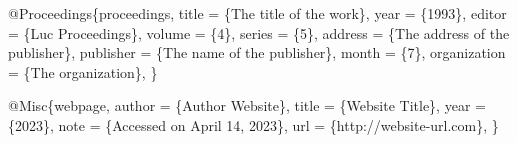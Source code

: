 \documentclass[
  stu,
  floatsintext,
  longtable,
  a4paper,
  nolmodern,
  notxfonts,
  notimes,
  donotrepeattitle,
  colorlinks=true,linkcolor=blue,citecolor=blue,urlcolor=blue]{apa7}
\newenvironment{Shaded}{\begin{snugshade}}{\end{snugshade}}
\newcommand{\NormalTok}[1]{\textcolor[rgb]{0.00,0.23,0.31}{#1}}
\begin{document}
\begin{Shaded}
\begin{Highlighting}[]
\NormalTok{    @Proceedings\{proceedings,}
\NormalTok{        title        = \{The title of the work\},}
\NormalTok{        year         = \{1993\},}
\NormalTok{        editor       = \{Luc Proceedings\},}
\NormalTok{        volume       = \{4\},}
\NormalTok{        series       = \{5\},}
\NormalTok{        address      = \{The address of the publisher\},}
\NormalTok{        publisher    = \{The name of the publisher\},}
\NormalTok{        month        = \{7\},}
\NormalTok{        organization = \{The organization\},}
\NormalTok{    \}}
    
\NormalTok{    @Misc\{webpage,}
\NormalTok{        author = \{Author Website\},}
\NormalTok{        title  = \{Website Title\},}
\NormalTok{        year   = \{2023\},}
\NormalTok{        note   = \{Accessed on April 14, 2023\},}
\NormalTok{        url    = \{http://website{-}url.com\},}
\NormalTok{    \}}
\end{Highlighting}
\end{Shaded}
\end{document}
